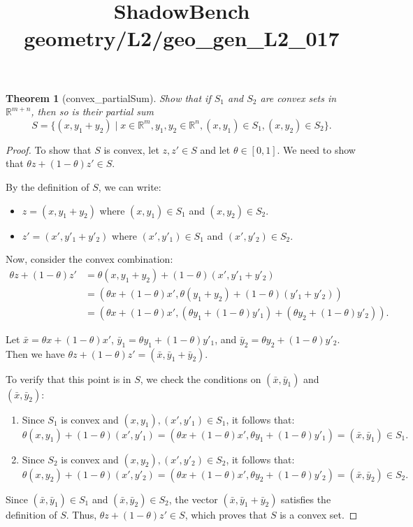 \documentclass{article}
\title{ShadowBench geometry/L2/geo\_gen\_L2\_017}
\newtheorem{theorem}{Theorem}
\begin{document}
\maketitle

\begin{theorem}[convex_partialSum]
Show that if $S_1$ and $S_2$ are convex sets in $\mathbb{R}^{m+n}$, then so is their partial sum
\[
S = \{(x, y_1 + y_2) \mid x \in \mathbb{R}^m, y_1, y_2 \in \mathbb{R}^n, (x, y_1) \in S_1, (x, y_2) \in S_2\}.
\]
\end{theorem}

\begin{proof}
To show that $S$ is convex, let $z, z' \in S$ and let $\theta \in [0, 1]$. We need to show that $\theta z + (1 - \theta)z' \in S$.

By the definition of $S$, we can write:
\begin{itemize}
    \item $z = (x, y_1 + y_2)$ where $(x, y_1) \in S_1$ and $(x, y_2) \in S_2$.
    \item $z' = (x', y'_1 + y'_2)$ where $(x', y'_1) \in S_1$ and $(x', y'_2) \in S_2$.
\end{itemize}

Now, consider the convex combination:
\begin{align*}
\theta z + (1 - \theta)z' &= \theta(x, y_1 + y_2) + (1 - \theta)(x', y'_1 + y'_2) \\
&= (\theta x + (1 - \theta)x', \theta(y_1 + y_2) + (1 - \theta)(y'_1 + y'_2)) \\
&= (\theta x + (1 - \theta)x', (\theta y_1 + (1 - \theta)y'_1) + (\theta y_2 + (1 - \theta)y'_2)).
\end{align*}

Let $\bar{x} = \theta x + (1 - \theta)x'$, $\bar{y}_1 = \theta y_1 + (1 - \theta)y'_1$, and $\bar{y}_2 = \theta y_2 + (1 - \theta)y'_2$. 
Then we have $\theta z + (1 - \theta)z' = (\bar{x}, \bar{y}_1 + \bar{y}_2)$.

To verify that this point is in $S$, we check the conditions on $(\bar{x}, \bar{y}_1)$ and $(\bar{x}, \bar{y}_2)$:
\begin{enumerate}
    \item Since $S_1$ is convex and $(x, y_1), (x', y'_1) \in S_1$, it follows that:
    \[
    \theta(x, y_1) + (1 - \theta)(x', y'_1) = (\theta x + (1 - \theta)x', \theta y_1 + (1 - \theta)y'_1) = (\bar{x}, \bar{y}_1) \in S_1.
    \]
    \item Since $S_2$ is convex and $(x, y_2), (x', y'_2) \in S_2$, it follows that:
    \[
    \theta(x, y_2) + (1 - \theta)(x', y'_2) = (\theta x + (1 - \theta)x', \theta y_2 + (1 - \theta)y'_2) = (\bar{x}, \bar{y}_2) \in S_2.
    \]
\end{enumerate}

Since $(\bar{x}, \bar{y}_1) \in S_1$ and $(\bar{x}, \bar{y}_2) \in S_2$, the vector $(\bar{x}, \bar{y}_1 + \bar{y}_2)$ satisfies the definition of $S$. Thus, $\theta z + (1 - \theta)z' \in S$, which proves that $S$ is a convex set.
\end{proof}
\end{document}
